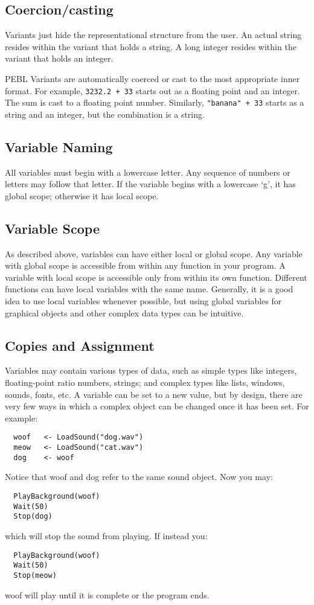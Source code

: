 \subsection{Coercion/casting}

Variants  just hide the representational structure
from the user. An actual string resides within the variant that holds a string. A long integer resides within the variant that holds an integer.

PEBL Variants are automatically coerced or cast to the
most appropriate inner format.  For example, \texttt{3232.2 + 33}
starts out as a floating point and an integer.  The sum is
cast to a floating point number. Similarly, \texttt{"banana" + 33}
starts as a string and an integer, but the combination is a string.


\subsection{Variable Naming}

All variables must begin with a lowercase letter. Any sequence of numbers or letters may follow that letter. If the variable begins with a lowercase `g', it has global scope; otherwise it has local scope.

\subsection{Variable Scope}

As described above, variables can have either local or  
global scope.  Any variable with global scope is accessible
from within any function in your program.  A variable with local
scope is accessible only from within its own function.  Different functions can have local variables with
the same name. Generally, it is a good idea  to use local
variables whenever possible, but using global variables for graphical
objects and other complex data types can be intuitive.

\subsection{Copies and Assignment}
\label{sec:copies_and_ass}

Variables may contain various types of data, such as simple types like integers, floating-point ratio numbers, strings; and complex types like lists, windows, sounds, fonts, etc. A variable can be set to a new value, but by design, there are very few ways in which a complex object can be changed once it has been set. For example:
\begin{verbatim}
  woof   <- LoadSound("dog.wav")
  meow   <- LoadSound("cat.wav")
  dog    <- woof
\end{verbatim}
Notice that woof and dog refer to the same sound object. Now you may:
\begin{verbatim}
  PlayBackground(woof)
  Wait(50)
  Stop(dog)
\end{verbatim}
which will stop the sound from playing. If instead you:
\begin{verbatim}
  PlayBackground(woof)
  Wait(50)
  Stop(meow)
\end{verbatim}
woof will play until it is complete or the program ends.

